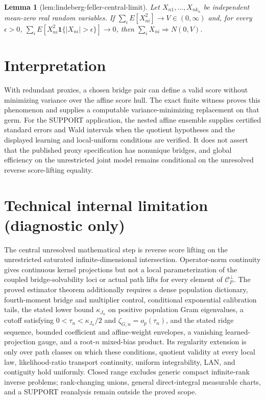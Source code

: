 \documentclass{article}
\newtheorem{lemma}{Lemma}
\begin{document}
\begin{lemma}[lem:lindeberg-feller-central-limit]\label{lem:lindeberg-feller-central-limit}
Let \(X_{n1},\ldots,X_{nk_n}\) be independent mean-zero real random variables.  If \(\sum_iE[X_{ni}^2]\to V\in(0,\infty)\) and, for every \(\epsilon>0\), \(\sum_iE[X_{ni}^2\mathbf 1\{|X_{ni}|>\epsilon\}]\to0\), then \(\sum_iX_{ni}\Rightarrow N(0,V)\).
\end{lemma}

\section{Interpretation}

With redundant proxies, a chosen bridge pair can define a valid score without minimizing variance over the affine score hull. The exact finite witness proves this phenomenon and supplies a computable variance-minimizing replacement on that germ. For the SUPPORT application, the nested affine ensemble supplies certified standard errors and Wald intervals when the quotient hypotheses and the displayed learning and local-uniform conditions are verified. It does not assert that the published proxy specification has nonunique bridges, and global efficiency on the unrestricted joint model remains conditional on the unresolved reverse score-lifting equality.

\section*{Technical internal limitation (diagnostic only)}

The central unresolved mathematical step is reverse score lifting on the unrestricted saturated infinite-dimensional intersection. Operator-norm continuity gives continuous kernel projections but not a local parameterization of the coupled bridge-solvability loci or actual path lifts for every element of \(\mathcal C_P^\perp\). The proved estimator theorem additionally requires a dense population dictionary, fourth-moment bridge and multiplier control, conditional exponential calibration tails, the stated lower bound \(\kappa_{J_n}\) on positive population Gram eigenvalues, a cutoff satisfying \(0<\tau_n<\kappa_{J_n}/2\) and \(\zeta_{G,n}=o_p(\tau_n)\), and the stated ridge sequence, bounded coefficient and affine-weight envelopes, a vanishing learned-projection gauge, and a root-\(n\) mixed-bias product. Its regularity extension is only over path classes on which these conditions, quotient validity at every local law, likelihood-ratio transport continuity, uniform integrability, LAN, and contiguity hold uniformly. Closed range excludes generic compact infinite-rank inverse problems; rank-changing unions, general direct-integral measurable charts, and a SUPPORT reanalysis remain outside the proved scope.
\end{document}

